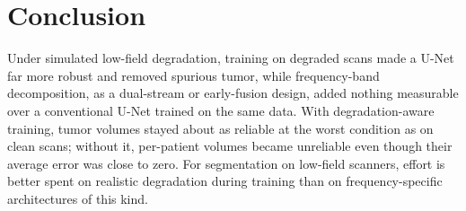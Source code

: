 \documentclass[conference]{IEEEtran}
\begin{document}
\section{Conclusion}
Under simulated low-field degradation, training on degraded scans made a U-Net far more robust and removed
spurious tumor, while frequency-band decomposition, as a dual-stream or early-fusion design, added nothing
measurable over a conventional U-Net trained on the same data. With degradation-aware training, tumor volumes
stayed about as reliable at the worst condition as on clean scans; without it, per-patient volumes became
unreliable even though their average error was close to zero. For segmentation on low-field scanners, effort is
better spent on realistic degradation during training than on frequency-specific architectures of this kind.



\end{document}
